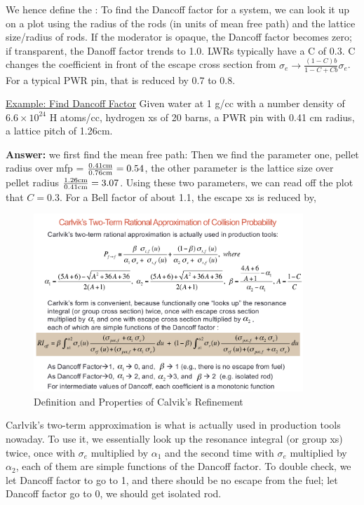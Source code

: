 \documentclass{school-22.211-notes}
\begin{document}
We hence define the :
To find the Dancoff factor for a system, we can look it up on a plot using the radius of the rods (in units of mean free path) and the lattice size/radius of rods. If the moderator is opaque, the Dancoff factor becomes zero; if transparent, the Danoff factor trends to 1.0. LWRs typically have a C of 0.3. 
C changes the coefficient in front of the escape cross section from $\sigma_e \to \frac{(1-C)b}{1-C + Cb} \sigma_e$. For a typical PWR pin, that is reduced by 0.7 to 0.8.

\uline{Example: Find Dancoff Factor} Given water at 1 g/cc with a number density of $6.6 \times 10^{24}$ H atoms/cc, hydrogen xs of 20 barns, a PWR pin with 0.41 cm radius, a lattice pitch of 1.26cm. 

\textbf{Answer:} we first find the mean free path: 
Then we find the parameter one, pellet radius over mfp = $\frac{0.41 \mathrm{cm}}{0.76 \mathrm{cm}}  = 0.54$, the other parameter is the lattice size over pellet radius $\frac{1.26 \mathrm{cm}}{0.41 \mathrm{cm}} = 3.07$. Using these two parameters, we can read off the plot that $C = 0.3$. For a Bell factor of about 1.1, the escape xs is reduced by,

\begin{figure}
  \centering
  \includegraphics[width=4in]{images/Carlvik-refinement.png}
  \caption{Definition and Properties of Calvik's Refinement} \label{Calvik}
\end{figure}

Carlvik's two-term approximation is what is actually used in production tools nowaday. To use it, we essentially look up the resonance integral (or group xs) twice, once with $\sigma_e$ multiplied by $\alpha_1$ and the second time with $\sigma_e$ multiplied by $\alpha_2$, each of them are simple functions of the Dancoff factor. To double check, we let Dancoff factor to go to 1, and there should be no escape from the fuel; let Dancoff factor go to 0, we should get isolated rod. 
\end{document}
